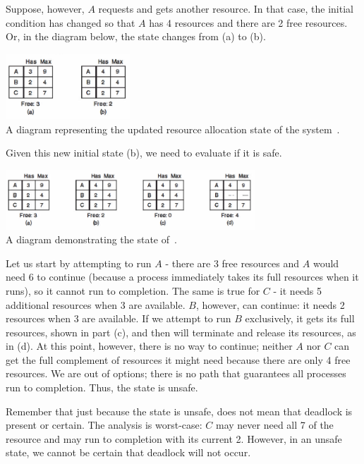 Suppose, however, $A$ requests and gets another resource. In that case, the initial condition has changed so that $A$ has 4 resources and there are 2 free resources. Or, in the diagram below, the state changes from (a) to (b).

\begin{center}
	\includegraphics[width=0.35\textwidth]{images/unsafe-state-initial.png}\\
	A diagram representing the updated resource allocation state of the system~\cite{mos}.
\end{center}

Given this new initial state (b), we need to evaluate if it is safe.

\begin{center}
	\includegraphics[width=0.70\textwidth]{images/unsafe-state.png}\\
	A diagram demonstrating the state of~\cite{mos}.
\end{center}

Let us start by attempting to run $A$ - there are 3 free resources and $A$ would need 6 to continue (because a process immediately takes its full resources when it runs), so it cannot run to completion. The same is true for $C$ - it needs 5 additional resources when 3 are available. $B$, however, can continue: it needs 2 resources when 3 are available. If we attempt to run $B$ exclusively, it gets its full resources, shown in part (c), and then will terminate and release its resources, as in (d). At this point, however, there is no way to continue; neither $A$ nor $C$ can get the full complement of resources it might need because there are only 4 free resources. We are out of options; there is no path that guarantees all processes run to completion. Thus, the state is unsafe.

Remember that just because the state is unsafe, does not mean that deadlock is present or certain. The analysis is worst-case: $C$ may never need all 7 of the resource and may run to completion with its current 2. However, in an unsafe state, we cannot be certain that deadlock will not occur.

